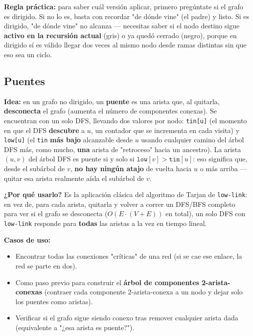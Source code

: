 \documentclass[10pt,a4paper,twocolumn]{article}
\begin{document}
\textbf{Regla práctica:} para saber cuál versión aplicar, primero
pregúntate si el grafo es dirigido. Si no lo es, basta con recordar
"de dónde vine" (el padre) y listo. Si es dirigido, "de dónde vine"
no alcanza — necesitas saber si el nodo destino sigue \textbf{activo
	en la recursión actual} (gris) o ya quedó cerrado (negro), porque en
dirigido sí es válido llegar dos veces al mismo nodo desde ramas
distintas sin que eso sea un ciclo.



\subsection{Puentes}

\textbf{Idea:} en un grafo no dirigido, un \textbf{puente} es una
arista que, al quitarla, \textbf{desconecta} el grafo (aumenta el
número de componentes conexas). Se encuentran con un solo DFS,
llevando dos valores por nodo: \texttt{tin[u]} (el momento en que el
DFS \textbf{descubre} a $u$, un contador que se incrementa en cada
visita) y \texttt{low[u]} (el \texttt{tin} \textbf{más bajo}
alcanzable desde $u$ usando cualquier camino del árbol DFS más, como
mucho, \textbf{una} arista de "retroceso" hacia un ancestro). La
arista $(u,v)$ del árbol DFS es puente si y solo si
$\texttt{low}[v] > \texttt{tin}[u]$: eso significa que, desde el
subárbol de $v$, \textbf{no hay ningún atajo} de vuelta hacia $u$ o
más arriba —quitar esa arista realmente aísla el subárbol de $v$.

\textbf{¿Por qué usarlo?} Es la aplicación clásica del algoritmo de
Tarjan de \texttt{low-link}: en vez de, para cada arista, quitarla y
volver a correr un DFS/BFS completo para ver si el grafo se
desconecta ($O(E \cdot (V+E))$ en total), un solo DFS con
\texttt{low-link} responde para \textbf{todas} las aristas a la vez
en tiempo lineal.

\textbf{Casos de uso:}

\begin{itemize}
	\item Encontrar todas las conexiones "críticas" de una red (si
	se cae ese enlace, la red se parte en dos).
	\item Como paso previo para construir el \textbf{árbol de
		componentes 2-arista-conexas} (contraer cada componente
	2-arista-conexa a un nodo y dejar solo los puentes como aristas).
	\item Verificar si el grafo sigue siendo conexo tras remover
	cualquier arista dada (equivalente a "¿esa arista es puente?").
\end{itemize}
\end{document}
